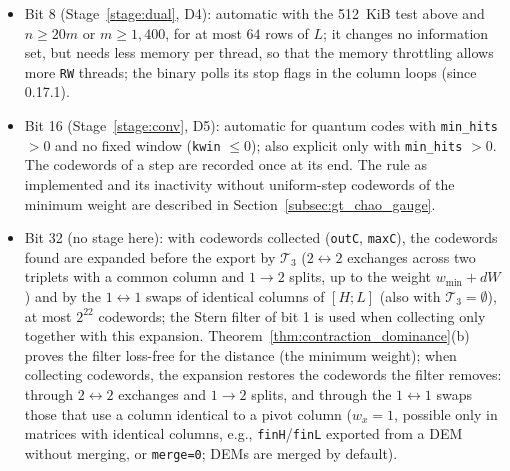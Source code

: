 \documentclass[12pt]{article}
\theoremstyle{definition}
\newcommand{\Tc}{\mathcal{T}_3}
\newcommand{\ttt}[1]{\texttt{#1}}
\begin{document}
\begin{itemize}
    (\ttt{dem\_rounds=0}), for a DEM without round structure and with $m \le 640$: the time-translation estimate of
    the input summary finds no shift of the
    errors by $D$ detectors, $2 \le D \le m/3$ (at least three detector layers), which maps at least half of them to
    other errors. A $T = 1$ DEM, with its two layers, never has one (the slabs gain where codewords are confined to
    one layer; on the $T = 1$ DEM of a folded double-gross circuit, the earlier slabs gave no gain), nor do folded
    schedules of several rounds, whose rounds alternate between two forms, or DEMs whose detectors are not in time
    order; \ttt{dem\_rounds} $\ge 2$ excludes the automatic slabs. The run plan and the input summary say which rule
    applies.
  \item Bit 8 (Stage~\ref{stage:dual}, D4): automatic with the 512~KiB test above and $n \ge 20 m$ or $m \ge 1{,}400$,
    for at most $64$ rows of $L$; it changes no information set, but needs less memory per thread, so that the memory
    throttling allows more \ttt{RW} threads; the binary polls its stop flags in the column loops (since 0.17.1).
  \item Bit 16 (Stage~\ref{stage:conv}, D5): automatic for quantum codes with \ttt{min\_hits} $> 0$ and no fixed window
    (\ttt{kwin} $\le 0$); also explicit only with \ttt{min\_hits} $> 0$. The codewords of a step are recorded once at
    its end. The rule as implemented and its inactivity without uniform-step codewords of the minimum weight are
    described in Section~\ref{subsec:gt_chao_gauge}.
  \item Bit 32 (no stage here): with codewords collected (\ttt{outC}, \ttt{maxC}), the codewords found are expanded
    before the export by $\Tc$ ($2 \leftrightarrow 2$ exchanges across two triplets with a common column and $1 \to 2$
    splits, up to the weight $w_{\min} + dW$) and by the $1 \leftrightarrow 1$ swaps of identical columns of $[H; L]$
    (also with $\Tc = \emptyset$), at most $2^{22}$ codewords; the Stern filter of bit 1 is used when collecting only
    together with this expansion. Theorem~\ref{thm:contraction_dominance}(b) proves the filter loss-free for the
    distance (the minimum weight); when collecting codewords, the expansion restores the codewords the filter removes:
    through $2 \leftrightarrow 2$ exchanges and $1 \to 2$ splits, and through the $1 \leftrightarrow 1$ swaps those
    that use a column identical to a pivot column ($w_x = 1$, possible only in matrices with identical columns, e.g.,
    \ttt{finH}/\ttt{finL} exported from a DEM without merging, or \ttt{merge=0}; DEMs are merged by default).

\end{itemize}
\end{document}
